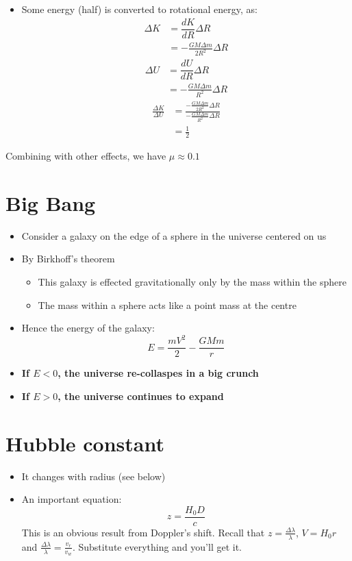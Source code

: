\documentclass{article}
\begin{document}
\begin{itemize}
\begin{itemize}
\begin{itemize}
\item Some energy (half) is converted to rotational energy, as:
\begin{align}
\Delta K& =\dfrac{dK}{dR} \Delta R\\
&=-\frac{GM\Delta m}{2R^2} \Delta R
\end{align}
\begin{align}
\Delta U& =\dfrac{dU}{dR} \Delta R\\
&=-\frac{GM\Delta m}{R^2} \Delta R
\end{align}
\begin{align}
\frac{\Delta K}{\Delta U}&=\frac{-\frac{GM\Delta m}{2R^2} \Delta R}{-\frac{GM\Delta m}{R^2} \Delta R}\\
&=\frac{1}{2}
\end{align}
\end{itemize}
\end{itemize}
Combining with other effects, we have $\mu \approx 0.1$
\end{itemize}
\section{Big Bang}
\begin{itemize}
\item Consider a galaxy on the edge of a sphere in the universe centered on us
\item By Birkhoff's theorem
\begin{itemize}
    \item This galaxy is effected gravitationally only by the mass within the sphere
    \item The mass within a sphere acts like a point mass at the centre
\end{itemize}
\item Hence the energy of the galaxy:
\begin{equation}
    E=\frac{mV^2}{2}-\frac{GMm}{r}
\end{equation}
\item \textbf{If $E<0$, the universe re-collaspes in a big crunch}
\item \textbf{If $E>0$, the universe continues to expand}
\end{itemize}
\section{Hubble constant}
\begin{itemize}
    \item It changes with radius (see below)
    \item An important equation:
    \begin{equation}
        z=\frac{H_0D}{c}
    \end{equation}
This is an obvious result from Doppler's shift. Recall that $z=\frac{\Delta \lambda}{\lambda}$, $V=H_0r$ and $\frac{\Delta \lambda}{\lambda}=\frac{v_r}{v_w}$. Substitute everything and you'll get it.
\end{itemize}
\end{document}
